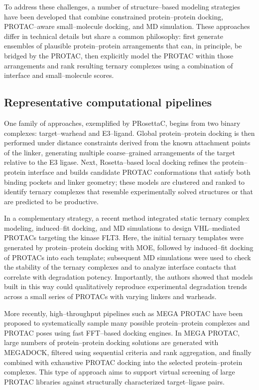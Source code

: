 \documentclass[12pt]{article}
\begin{document}
To address these challenges, a number of structure–based modeling strategies have been developed that combine constrained protein–protein docking, PROTAC–aware small–molecule docking, and MD simulation.\cite{CH14_Drummond2020,CH14_PRosettaC2020,CH14_flt3protac2025,CH14_megaprotac2025}   
These approaches differ in technical details but share a common philosophy: first generate ensembles of plausible protein–protein arrangements that can, in principle, be bridged by the PROTAC, then explicitly model the PROTAC within those arrangements and rank resulting ternary complexes using a combination of interface and small–molecule scores.

\subsection{Representative computational pipelines}

One family of approaches, exemplified by PRosettaC, begins from two binary complexes: target–warhead and E3–ligand.\cite{CH14_PRosettaC2020}
Global protein–protein docking is then performed under distance constraints derived from the known attachment points of the linker, generating multiple coarse–grained arrangements of the target relative to the E3 ligase.  
Next, Rosetta–based local docking refines the protein–protein interface and builds candidate PROTAC conformations that satisfy both binding pockets and linker geometry; these models are clustered and ranked to identify ternary complexes that resemble experimentally solved structures or that are predicted to be productive.\cite{CH14_PRosettaC2020,CH14_Drummond2020}

In a complementary strategy, a recent method integrated static ternary complex modeling, induced–fit docking, and MD simulations to design VHL–mediated PROTACs targeting the kinase FLT3.
Here, the initial ternary templates were generated by protein–protein docking with MOE, followed by induced–fit docking of PROTACs into each template; subsequent MD simulations were used to check the stability of the ternary complexes and to analyze interface contacts that correlate with degradation potency.  
Importantly, the authors showed that models built in this way could qualitatively reproduce experimental degradation trends across a small series of PROTACs with varying linkers and warheads.\cite{CH14_flt3protac2025}

More recently, high–throughput pipelines such as MEGA PROTAC have been proposed to systematically sample many possible protein–protein complexes and PROTAC poses using fast FFT–based docking engines.  
In MEGA PROTAC, large numbers of protein–protein docking solutions are generated with MEGADOCK, filtered using sequential criteria and rank aggregation, and finally combined with exhaustive PROTAC docking into the selected protein–protein complexes.\cite{CH14_megaprotac2025} 
This type of approach aims to support virtual screening of large PROTAC libraries against structurally characterized target–ligase pairs.
\end{document}
